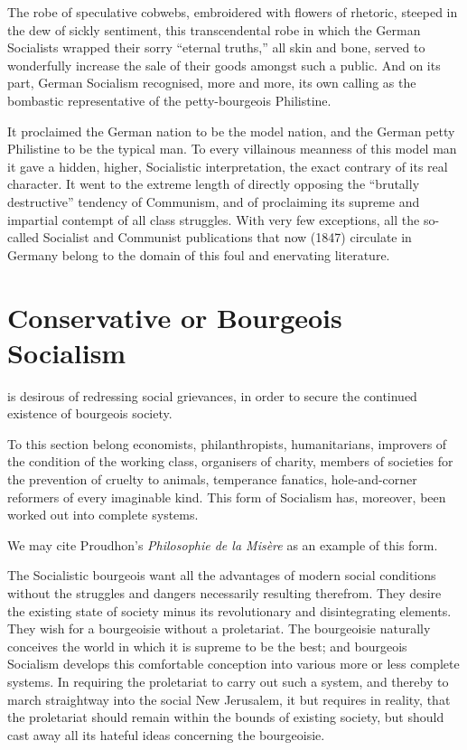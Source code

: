 The robe of speculative cobwebs, embroidered with flowers of rhetoric,
steeped in the dew of sickly sentiment, this transcendental robe in
which the German Socialists wrapped their sorry \enquote{eternal truths,} all
skin and bone, served to wonderfully increase the sale of their goods
amongst such a public. And on its part, German Socialism recognised,
more and more, its own calling as the bombastic representative of the
petty-bourgeois Philistine.

It proclaimed the German nation to be the model nation, and the German
petty Philistine to be the typical man. To every villainous meanness of
this model man it gave a hidden, higher, Socialistic interpretation,
the exact contrary of its real character. It went to the extreme length
of directly opposing the \enquote{brutally destructive} tendency of Communism,
and of proclaiming its supreme and impartial contempt of all class
struggles. With very few exceptions, all the so-called Socialist and
Communist publications that now (1847) circulate in Germany belong to
the domain of this foul and enervating literature.

\section*{Conservative or Bourgeois Socialism}
 is desirous of redressing social grievances,
in order to secure the continued existence of bourgeois society.

To this section belong economists, philanthropists, humanitarians,
improvers of the condition of the working class, organisers of charity,
members of societies for the prevention of cruelty to animals,
temperance fanatics, hole-and-corner reformers of every imaginable
kind. This form of Socialism has, moreover, been worked out into
complete systems.

We may cite Proudhon’s \textit{Philosophie de la Misère} as an example of this
form.

The Socialistic bourgeois want all the advantages of modern social
conditions without the struggles and dangers necessarily resulting
therefrom. They desire the existing state of society minus its
revolutionary and disintegrating elements. They wish for a bourgeoisie
without a proletariat. The bourgeoisie naturally conceives the world in
which it is supreme to be the best; and bourgeois Socialism develops
this comfortable conception into various more or less complete systems.
In requiring the proletariat to carry out such a system, and thereby to
march straightway into the social New Jerusalem, it but requires in
reality, that the proletariat should remain within the bounds of
existing society, but should cast away all its hateful ideas concerning
the bourgeoisie.

